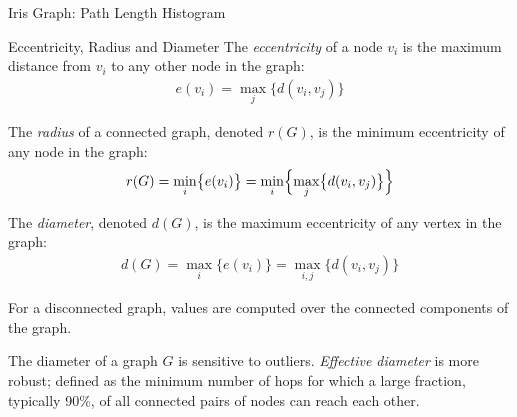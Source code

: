 \begin{frame}{Iris Graph: Path Length Histogram}
    \begin{center}
    \end{center}
\end{frame}


\begin{frame}{Eccentricity, Radius and Diameter}
The {\em eccentricity} of a node $v_i$ is the maximum distance
from $v_i$ to any other node in the graph:
\begin{align*}
e(v_i) = \max_{j} \bigl\{ d(v_i, v_{j}) \bigr\}
\end{align*}

\medskip
The {\em radius} of a connected
graph, denoted $r(G)$, is the minimum eccentricity of any node in
the graph:
\begin{align*}
r(G) = \min_{i} \bigl\{ e(v_i) \bigr\} =
\min_i \Bigl\{\max_{j} \bigl \{ d(v_i, v_{j}) \bigr\} \Bigr\}
\end{align*}

\medskip
The {\em diameter},
denoted $d(G)$, is the maximum eccentricity of any vertex in the
graph:
\begin{align*}
d(G) = \max_{i} \bigl\{ e(v_i) \bigr\} = \max_{i,j} \bigl\{
d(v_i, v_{j})\bigr\}
\end{align*}

For a disconnected graph, values are
computed over the connected components of the graph.

\medskip
The diameter of a graph $G$ is sensitive to outliers.
{\em Effective diameter} is more robust; def\/{i}ned as the minimum
number of hops for which a large fraction, typically 90\%, of all
connected pairs of nodes can reach each other. 
\end{frame}




